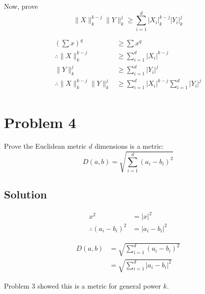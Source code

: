 \documentclass{IEEEtran}
\begin{document}
Now, prove \[ \|X\|_k^{k-j} \|Y\|_k^j \ge \sum_{i=1}^d \left|X_i\right|_k^{k-j} \left|Y_i\right|_k^j \]

\begin{align*}
    \left( \sum x \right)^q &\ge \sum x^q \\
    \therefore \|X\|_k^{k-j} &\ge \sum_{i=1}^d \left|X_i\right|^{k-j} \\
    \|Y\|_k^j &\ge \sum_{i=1}^d \left|Y_i\right|^j \\
    \therefore \|X\|_k^{k-j} \|Y\|_k^j &\ge \sum_{i=1}^d \left|X_i\right|^{k-j} \sum_{i=1}^d \left|Y_i\right|^j \\
\end{align*}

\newpage

\section{Problem 4} %
Prove the Euclidean metric \(d\) dimensions is a metric:
\[D(a,b) = \sqrt{\sum_{i=1}^d \left(a_i - b_i\right)^2}\]

\subsection{Solution}
\begin{align*}
    x^2 &= |x|^2 \\
    \therefore \left(a_i - b_i\right)^2 &= \left|a_i - b_i\right|^2
\end{align*}

\begin{align*}
    D(a,b) &= \sqrt{\sum_{i=1}^d \left(a_i - b_i\right)^2} \\
    &= \sqrt{\sum_{i=1}^d \left|a_i - b_i\right|^2}
\end{align*}

Problem 3 showed this is a metric for general power \(k\).
\end{document}
